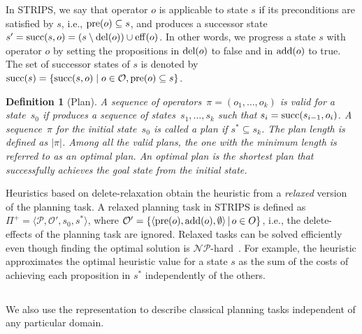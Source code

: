 \documentclass[ppgc,diss,english]{iiufrgs}
\newtheorem{definition}{Definition}
\begin{document}
In STRIPS, we say that operator $o$ is applicable to state $s$ if its preconditions are satisfied by $s$, i.e., $\operatorname{pre}(o) \subseteq s$, and produces a successor state~$s' = \operatorname{succ}(s,o) = (s \setminus \operatorname{del}(o)) \cup \operatorname{eff}(o)$. In other words, we progress a state $s$ with operator $o$ by setting the propositions in $\operatorname{del}(o)$ to false and in $\operatorname{add}(o)$ to true. The set of successor states of $s$ is denoted by~$\operatorname{succ}(s)=\{\operatorname{succ}(s,o)\mid o\in \mathcal{O}, \operatorname{pre}(o) \subseteq s\}$.

\begin{definition}[Plan]\label{def:plan}
A sequence of operators~$\pi=(o_1,\ldots,o_k)$ is valid for a state~$s_0$ if produces a sequence of states~$s_1,\ldots,s_k$ such that $s_i=\operatorname{succ}(s_{i-1},o_i)$. A sequence~$\pi$ for the initial state~$s_{0}$ is called a plan if $s^{*} \subseteq s_{k}$. The plan length is defined as $|\pi|$. Among all the valid plans, the one with the minimum length is referred to as an optimal plan. An optimal plan is the shortest plan that successfully achieves the goal state from the initial state.
\end{definition}

Heuristics based on delete-relaxation obtain the heuristic from a \emph{relaxed} version of the planning task. A relaxed planning task in STRIPS is defined as $\Pi^{+}=\langle\mathcal{P},\mathcal{O'},s_{0},s^{*}\rangle$, where $\mathcal{O'} = \{ \langle \operatorname{pre}(o), \operatorname{add}(o), \emptyset \rangle \,|\, o \in O \}$, i.e., the delete-effects of the planning task are ignored. Relaxed tasks can be solved efficiently even though finding the optimal solution is $\mathcal{NP}$-hard~\cite{Bylander/1994}. For example, the heuristic \hadd approximates the optimal heuristic value for a state $s$ as the sum of the costs of achieving each proposition in $s^{*}$ independently of the others.

\subsection{\sas}
\label{sec:background-sas}
We also use the \sas representation to describe classical planning tasks independent of any particular domain.
\end{document}
